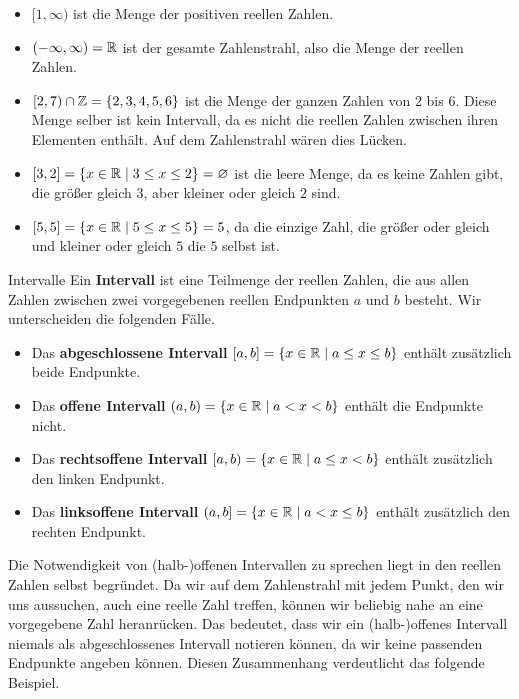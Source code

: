 \documentclass[../../main.tex]{subfiles}
\begin{document}
	\begin{example}{}
		\begin{itemize}
			\item $[1,\infty)$ ist die Menge der positiven reellen Zahlen. 
			\item $(-\infty,\infty) = \mathbb{R}$ ist der gesamte Zahlenstrahl, also die Menge der reellen Zahlen.
			\item $[2,7) \cap \mathbb{Z} = \{2,3,4,5,6\}$ ist die Menge der ganzen Zahlen von $2$ bis $6$. Diese Menge selber ist kein Intervall, da es nicht die reellen Zahlen zwischen ihren Elementen enthält. Auf dem Zahlenstrahl wären dies Lücken. 
			\item $[3,2] = \left\{ x \in \mathbb{R} \mid 3 \leq x \leq 2\right\} = \varnothing$ ist die leere Menge, da es keine Zahlen gibt, die größer gleich $3$, aber kleiner oder gleich $2$ sind.
			\item $[5,5] = \left\{ x \in \mathbb{R} \mid 5 \leq x \leq 5\right\} = 5$, da die einzige Zahl, die größer oder gleich und kleiner oder gleich $5$ die $5$ selbst ist.
		\end{itemize}
	\end{example}

	\begin{definition}{Intervalle}
		Ein \textbf{Intervall} ist eine Teilmenge der reellen Zahlen, die aus allen Zahlen zwischen zwei vorgegebenen reellen Endpunkten $a$ und $b$ besteht. Wir unterscheiden die folgenden Fälle.
		\begin{itemize}
			\item Das \textbf{abgeschlossene Intervall} $[a,b] = \left\{ x \in \mathbb{R} \mid a \leq x \leq b\right\}$ enthält zusätzlich beide Endpunkte.
			\item Das \textbf{offene Intervall} $(a,b) = \left\{ x \in \mathbb{R} \mid a < x < b\right\}$ enthält die Endpunkte nicht.
			\item Das \textbf{rechtsoffene Intervall} $[a,b) = \left\{ x \in \mathbb{R} \mid a \leq x < b\right\}$ enthält zusätzlich  den linken Endpunkt.
			\item Das \textbf{linksoffene Intervall} $(a,b] = \left\{ x \in \mathbb{R} \mid a < x \leq b\right\}$ enthält zusätzlich den rechten Endpunkt.
		\end{itemize}
	\end{definition}

	
	Die Notwendigkeit von (halb-)offenen Intervallen zu sprechen liegt in den reellen Zahlen selbst begründet. Da wir auf dem Zahlenstrahl mit jedem Punkt, den wir uns aussuchen, auch eine reelle Zahl treffen, können wir beliebig nahe an eine vorgegebene Zahl heranrücken. Das bedeutet, dass wir ein (halb-)offenes Intervall niemals als abgeschlossenes Intervall notieren können, da wir keine passenden Endpunkte angeben können. Diesen Zusammenhang verdeutlicht das folgende Beispiel.
	
\end{document}
